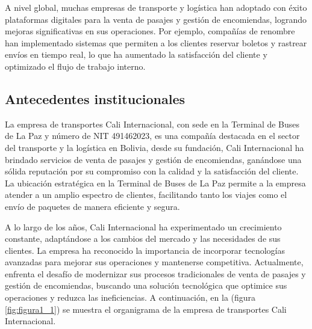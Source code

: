	A nivel global, muchas empresas de transporte y logística han adoptado con éxito plataformas digitales para la venta de pasajes y gestión de encomiendas, logrando mejoras significativas en sus operaciones. Por ejemplo, compañías de renombre han implementado sistemas que permiten a los clientes reservar boletos y rastrear envíos en tiempo real, lo que ha aumentado la satisfacción del cliente y optimizado el flujo de trabajo interno.
	
	
	\subsection{Antecedentes institucionales}
	
	La empresa de transportes Cali Internacional, con sede en la Terminal de Buses de La Paz y número de NIT 491462023, es una compañía destacada en el sector del transporte y la logística en Bolivia, desde su fundación, Cali Internacional ha brindado servicios de venta de pasajes y gestión de encomiendas, ganándose una sólida reputación por su compromiso con la calidad y la satisfacción del cliente. La ubicación estratégica en la Terminal de Buses de La Paz permite a la empresa atender a un amplio espectro de clientes, facilitando tanto los viajes como el envío de paquetes de manera eficiente y segura.
	
	A lo largo de los años, Cali Internacional ha experimentado un crecimiento constante, adaptándose a los cambios del mercado y las necesidades de sus clientes. La empresa ha reconocido la importancia de incorporar tecnologías avanzadas para mejorar sus operaciones y mantenerse competitiva. Actualmente, enfrenta el desafío de modernizar sus procesos tradicionales de venta de pasajes y gestión de encomiendas, buscando una solución tecnológica que optimice sus operaciones y reduzca las ineficiencias. A continuación, en la (figura \ref{fig:figura1_1}) se muestra el organigrama de la empresa de transportes Cali Internacional.
	
